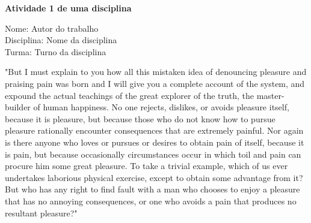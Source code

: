 \documentclass[12pt,a4paper]{article}
\begin{document}
\begin{center}
{\large\textbf{Atividade 1 de uma disciplina}}
\end{center}
\vspace{0.5cm}

\begin{flushleft}
Nome: Autor do trabalho \\
Disciplina: Nome da disciplina\\
Turma: Turno da disciplina
\end{flushleft}

\begin{landscape}
"But I must explain to you how all this mistaken idea of denouncing pleasure and praising pain was born and I will give you a complete account of the system, and expound the actual teachings of the great explorer of the truth, the master-builder of human happiness. No one rejects, dislikes, or avoids pleasure itself, because it is pleasure, but because those who do not know how to pursue pleasure rationally encounter consequences that are extremely painful. Nor again is there anyone who loves or pursues or desires to obtain pain of itself, because it is pain, but because occasionally circumstances occur in which toil and pain can procure him some great pleasure. To take a trivial example, which of us ever undertakes laborious physical exercise, except to obtain some advantage from it? But who has any right to find fault with a man who chooses to enjoy a pleasure that has no annoying consequences, or one who avoids a pain that produces no resultant pleasure?"

\end{landscape}
\end{document}
